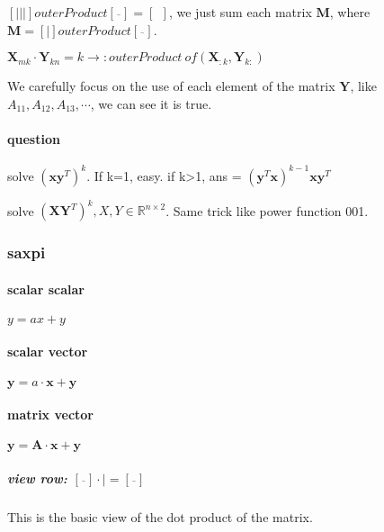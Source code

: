 \documentclass[UTF8]{../../09-Mathematics}
\begin{document}
$ [|||]  outerProduct [\overline{\ \ } ] =  [ \ \ ]$, we just sum each matrix $\boldsymbol M$, where $\boldsymbol M =[|]  outerProduct [\overline{\ \ } ]  $.

$\boldsymbol X_{mk} \cdot \boldsymbol Y_{kn} = k \rightarrow : outerProduct \ of (\boldsymbol X_{:k}, \boldsymbol  Y_{k:})$

We carefully focus on the use of each element of the matrix $\boldsymbol Y$, like  $A_{11}, A_{12},A_{13}, \cdots$, we can see it is true.


\paragraph{question }

solve $(\boldsymbol x \boldsymbol y^T)^k$. If k=1, easy. if k>1, ans = $ (\boldsymbol y^T \boldsymbol x )^{k-1}  \boldsymbol x \boldsymbol y^T$


solve $(\boldsymbol X \boldsymbol Y^T)^k, X,Y \in \mathbb{R}^{n \times 2}$. Same trick like power function 001.


\subsubsection{saxpi}

\paragraph{scalar scalar}
$y = ax + y$

\paragraph{scalar vector}
$ \boldsymbol y = a \cdot  \boldsymbol  x + \boldsymbol y$


\paragraph{matrix vector}
$ \boldsymbol y = \boldsymbol A \cdot  \boldsymbol  x + \boldsymbol y$





\subparagraph{view row: $ [\overline{\ \ } ] \cdot | =  [\overline{\ \ } ]$}

This is the basic view of the dot product of the matrix.
\end{document}
